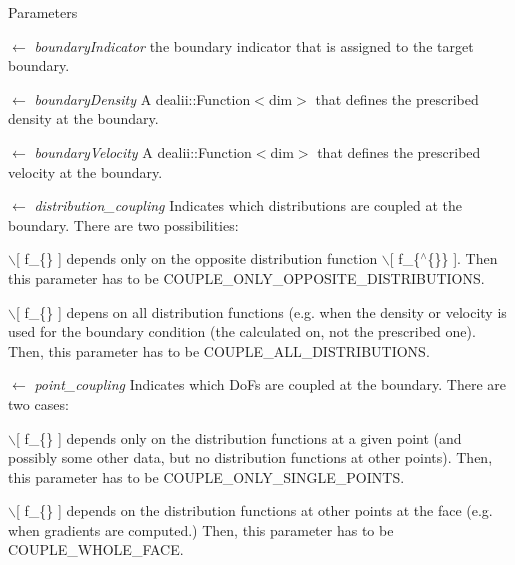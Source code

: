 \begin{DoxyParams}{Parameters}
\item[\mbox{$\leftarrow$} {\em boundaryIndicator}]the boundary indicator that is assigned to the target boundary. \item[\mbox{$\leftarrow$} {\em boundaryDensity}]A dealii::Function$<$dim$>$ that defines the prescribed density at the boundary. \item[\mbox{$\leftarrow$} {\em boundaryVelocity}]A dealii::Function$<$dim$>$ that defines the prescribed velocity at the boundary. \item[\mbox{$\leftarrow$} {\em distribution\_\-coupling}]Indicates which distributions are coupled at the boundary. There are two possibilities:
\begin{DoxyEnumerate}
\item $\backslash$\mbox{[} f\_\-\{\} \mbox{]} depends only on the opposite distribution function $\backslash$\mbox{[} f\_\-\{$^\wedge$\{\}\} \mbox{]}. Then this parameter has to be COUPLE\_\-ONLY\_\-OPPOSITE\_\-DISTRIBUTIONS.
\item $\backslash$\mbox{[} f\_\-\{\} \mbox{]} depens on all distribution functions (e.g. when the density or velocity is used for the boundary condition (the calculated on, not the prescribed one). Then, this parameter has to be COUPLE\_\-ALL\_\-DISTRIBUTIONS. 
\end{DoxyEnumerate}\item[\mbox{$\leftarrow$} {\em point\_\-coupling}]Indicates which DoFs are coupled at the boundary. There are two cases:
\begin{DoxyEnumerate}
\item $\backslash$\mbox{[} f\_\-\{\} \mbox{]} depends only on the distribution functions at a given point (and possibly some other data, but no distribution functions at other points). Then, this parameter has to be COUPLE\_\-ONLY\_\-SINGLE\_\-POINTS.
\item $\backslash$\mbox{[} f\_\-\{\} \mbox{]} depends on the distribution functions at other points at the face (e.g. when gradients are computed.) Then, this parameter has to be COUPLE\_\-WHOLE\_\-FACE. 
\end{DoxyEnumerate}\end{DoxyParams}


